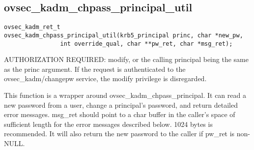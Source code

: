 \subsection{ovsec_kadm_chpass_principal_util}

\begin{verbatim}
ovsec_kadm_ret_t
ovsec_kadm_chpass_principal_util(krb5_principal princ, char *new_pw, 
                int override_qual, char **pw_ret, char *msg_ret);
\end{verbatim}

AUTHORIZATION REQUIRED: modify, or the calling principal being the
same as the princ argument.  If the request is authenticated to the
ovsec_kadm/changepw service, the modify privilege is disregarded.

This function is a wrapper around ovsec_kadm_chpass_principal. It can
read a new password from a user, change a principal's password, and
return detailed error messages.  msg_ret should point to a char buffer
in the caller's space of sufficient length for the error messages
described below. 1024 bytes is recommended.  It will also return the
new password to the caller if pw_ret is non-NULL.

